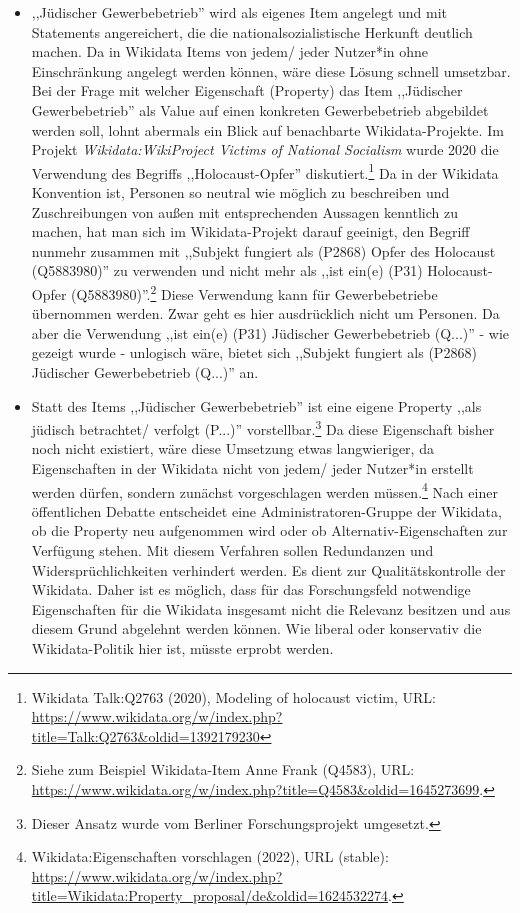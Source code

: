 \begin{itemize}
    \item ,,Jüdischer Gewerbebetrieb'' wird als eigenes Item angelegt und mit Statements angereichert, die die nationalsozialistische Herkunft deutlich machen. Da in Wikidata Items von jedem/ jeder Nutzer*in ohne Einschränkung angelegt werden können, wäre diese Lösung schnell umsetzbar. Bei der Frage mit welcher Eigenschaft (Property) das Item ,,Jüdischer Gewerbebetrieb'' als Value auf einen konkreten Gewerbebetrieb abgebildet werden soll, lohnt abermals ein Blick auf benachbarte Wikidata-Projekte. Im Projekt \textit{Wikidata:WikiProject Victims of National Socialism} wurde 2020 die Verwendung des Begriffs ,,Holocaust-Opfer'' diskutiert.\footnote{Wikidata Talk:Q2763 (2020), Modeling of holocaust victim, URL: \url{https://www.wikidata.org/w/index.php?title=Talk:Q2763&oldid=1392179230}} Da in der Wikidata Konvention ist, Personen so neutral wie möglich zu beschreiben und Zuschreibungen von außen mit entsprechenden Aussagen kenntlich zu machen, hat man sich im Wikidata-Projekt darauf geeinigt, den Begriff nunmehr zusammen mit ,,Subjekt fungiert als (P2868) Opfer des Holocaust (Q5883980)'' zu verwenden und nicht mehr als ,,ist ein(e) (P31) Holocaust-Opfer (Q5883980)''.\footnote{Siehe zum Beispiel Wikidata-Item Anne Frank (Q4583), URL: \url{https://www.wikidata.org/w/index.php?title=Q4583&oldid=1645273699}.} Diese Verwendung kann für Gewerbebetriebe übernommen werden. Zwar geht es hier ausdrücklich nicht um Personen. Da aber die Verwendung ,,ist ein(e) (P31) Jüdischer Gewerbebetrieb (Q...)'' - wie gezeigt wurde - unlogisch wäre, bietet sich ,,Subjekt fungiert als (P2868) Jüdischer Gewerbebetrieb (Q...)'' an.
    \item Statt des Items ,,Jüdischer Gewerbebetrieb'' ist eine eigene Property ,,als jüdisch betrachtet/ verfolgt (P...)'' vorstellbar.\footnote{Dieser Ansatz wurde vom Berliner Forschungsprojekt umgesetzt.} Da diese Eigenschaft bisher noch nicht existiert, wäre diese Umsetzung etwas langwieriger, da Eigenschaften in der Wikidata nicht von jedem/ jeder Nutzer*in erstellt werden dürfen, sondern zunächst vorgeschlagen werden müssen.\footnote{Wikidata:Eigenschaften vorschlagen (2022), URL (stable): \url{https://www.wikidata.org/w/index.php?title=Wikidata:Property_proposal/de&oldid=1624532274}.} Nach einer öffentlichen Debatte entscheidet eine Administratoren-Gruppe der Wikidata, ob die Property neu aufgenommen wird oder ob Alternativ-Eigenschaften zur Verfügung stehen. Mit diesem Verfahren sollen Redundanzen und Widersprüchlichkeiten verhindert werden. Es dient zur Qualitätskontrolle der Wikidata. Daher ist es möglich, dass für das Forschungsfeld notwendige Eigenschaften für die Wikidata insgesamt nicht die Relevanz besitzen und aus diesem Grund abgelehnt werden können. Wie liberal oder konservativ die Wikidata-Politik hier ist, müsste erprobt werden.      
\end{itemize} 

